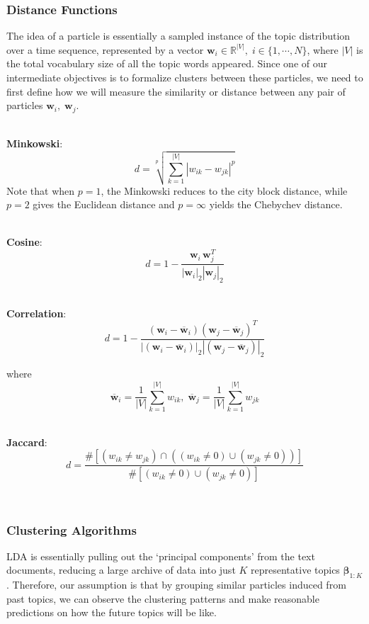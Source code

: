 \documentclass[conference]{IEEEtran}
\begin{document}
\subsubsection{Distance Functions}
The idea of a particle is essentially a sampled instance of the topic distribution over a time sequence, represented by a vector $\mathbf{w}_i\in \mathbb{R}^{|V|},\; i \in \{1,\cdots,N\}$, where $|V|$ is the total vocabulary size of all the topic words appeared. Since one of our intermediate objectives is to formalize clusters between these particles, we need to first define how we will measure the similarity or distance between any pair of particles $\mathbf{w}_i,\; \mathbf{w}_j$. 

\-\\
\textbf{Minkowski}: 
\begin{equation*}
	d = \sqrt[p]{\sum_{k=1}^{|V|}|w_{ik} - w_{jk}|^p}
\end{equation*}
 Note that when $p=1$, the Minkowski reduces to the city block distance, while $p=2$ gives the Euclidean distance and $p=\infty$ yields the Chebychev distance.

\-\\
\textbf{Cosine}: 
\begin{equation*}
d = 1 - \frac{\mathbf{w}_i\,\mathbf{w}_j^T}{|\mathbf{w}_i|_2|\mathbf{w}_j|_2}
\end{equation*}

\-\\
\textbf{Correlation}: 
\begin{equation*}
d = 1 - \frac{(\mathbf{w}_i - \overline{\mathbf{w}}_i)(\mathbf{w}_j - \overline{\mathbf{w}}_j)^T}{|(\mathbf{w}_i - \overline{\mathbf{w}}_i)|_2|(\mathbf{w}_j - \overline{\mathbf{w}}_j)|_2}
\end{equation*}

where 
\begin{equation*}
	\overline{\mathbf{w}}_i = \frac{1}{|V|}\sum_{k=1}^{|V|}w_{ik},\;
	\overline{\mathbf{w}}_j = \frac{1}{|V|}\sum_{k=1}^{|V|}w_{jk}
\end{equation*}

\-\\
\textbf{Jaccard}: 
\begin{equation*}
	d = \frac{\# \left[(w_{ik} \neq w_{jk})\cap((w_{ik} \neq 0)\cup(w_{jk} \neq 0))\right]}{\#\left[(w_{ik} \neq 0)\cup(w_{jk} \neq 0)\right]}
\end{equation*}

\-\\

\subsubsection{Clustering Algorithms}
LDA is essentially pulling out the `principal components' from the text documents, reducing a large archive of data into just $K$ representative topics $\mathbf{\beta}_{1:K}$. Therefore, our assumption is that by grouping similar particles induced from past topics, we can observe the clustering patterns and make reasonable predictions on how the future topics will be like.
\end{document}
